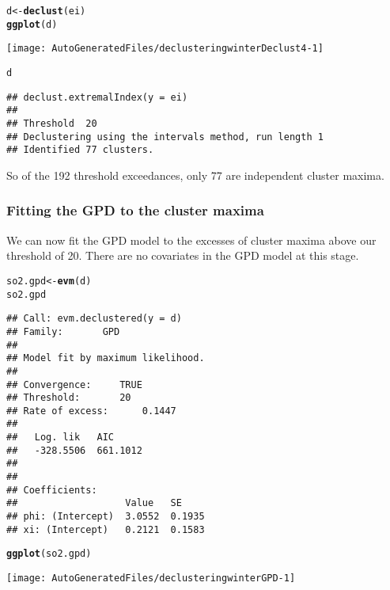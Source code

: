 \documentclass[10pt]{article}\usepackage[]{graphicx}\usepackage[]{color}
\makeatletter
\def\maxwidth{ %
  \ifdim\Gin@nat@width>\linewidth
    \linewidth
  \else
    \Gin@nat@width
  \fi
}
\newcommand{\hlstd}[1]{\textcolor[rgb]{0.345,0.345,0.345}{#1}}%
\newcommand{\hlkwb}[1]{\textcolor[rgb]{0.69,0.353,0.396}{#1}}%
\newcommand{\hlkwd}[1]{\textcolor[rgb]{0.737,0.353,0.396}{\textbf{#1}}}%
\newenvironment{kframe}{%
 \def\at@end@of@kframe{}%
 \ifinner\ifhmode%
  \def\at@end@of@kframe{\end{minipage}}%
  \begin{minipage}{\columnwidth}%
 \fi\fi%
 \def\FrameCommand##1{\hskip\@totalleftmargin \hskip-\fboxsep
 \colorbox{shadecolor}{##1}\hskip-\fboxsep
     \hskip-\linewidth \hskip-\@totalleftmargin \hskip\columnwidth}%
 \MakeFramed {\advance\hsize-\width
   \@totalleftmargin\z@ \linewidth\hsize
   \@setminipage}}%
 {\par\unskip\endMakeFramed%
 \at@end@of@kframe}
\newenvironment{knitrout}{}{} %
\makeatother
\begin{document}
\begin{knitrout}
\color{fgcolor}\begin{kframe}
\begin{alltt}
\hlstd{d} \hlkwb{<-} \hlkwd{declust}\hlstd{(ei)}
\hlkwd{ggplot}\hlstd{(d)}
\end{alltt}
\end{kframe}
\texttt{[image: AutoGeneratedFiles/declusteringwinterDeclust4-1]} 
\begin{kframe}\begin{alltt}
\hlstd{d}
\end{alltt}
\begin{verbatim}
## declust.extremalIndex(y = ei)
## 
## Threshold  20 
## Declustering using the intervals method, run length 1 
## Identified 77 clusters.
\end{verbatim}
\end{kframe}
\end{knitrout}

So of the 192 threshold exceedances, only 77 are independent cluster maxima.

\subsubsection*{Fitting the GPD to the cluster maxima}

We can now fit the GPD model to the excesses of cluster maxima above our threshold of 20.  There are no covariates in the GPD model at this stage.

\begin{knitrout}
\color{fgcolor}\begin{kframe}
\begin{alltt}
\hlstd{so2.gpd} \hlkwb{<-} \hlkwd{evm}\hlstd{(d)}
\hlstd{so2.gpd}
\end{alltt}
\begin{verbatim}
## Call: evm.declustered(y = d)
## Family:       GPD 
## 
## Model fit by maximum likelihood.
## 
## Convergence:		TRUE
## Threshold:		20
## Rate of excess:		0.1447
## 
##   Log. lik   AIC     
##   -328.5506  661.1012
## 
## 
## Coefficients:
##                   Value   SE    
## phi: (Intercept)  3.0552  0.1935
## xi: (Intercept)   0.2121  0.1583
\end{verbatim}
\begin{alltt}
\hlkwd{ggplot}\hlstd{(so2.gpd)}
\end{alltt}
\end{kframe}
\texttt{[image: AutoGeneratedFiles/declusteringwinterGPD-1]} 

\end{knitrout}
\label{fig:SO2noCovariates}
\end{document}
